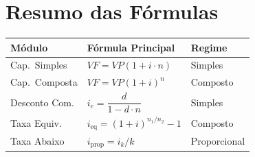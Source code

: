 \documentclass[12pt,a4paper]{article}
\begin{document}
\section{Resumo das Fórmulas}

\begin{center}
\renewcommand{\arraystretch}{1.6}
\begin{tabular}{lll}
  \toprule
  \textbf{Módulo} & \textbf{Fórmula Principal} & \textbf{Regime} \\
  \midrule
  Cap.\ Simples   & $VF = VP(1 + i \cdot n)$ & Simples \\
  Cap.\ Composta  & $VF = VP(1 + i)^n$       & Composto \\
  Desconto Com.   & $i_e = \dfrac{d}{1 - d \cdot n}$ & Simples \\[0.4em]
  Taxa Equiv.     & $i_{\text{eq}} = (1 + i)^{n_1/n_2} - 1$ & Composto \\[0.2em]
  Taxa Abaixo     & $i_{\text{prop}} = i_k / k$ & Proporcional \\
  \bottomrule
\end{tabular}
\end{center}
\end{document}

